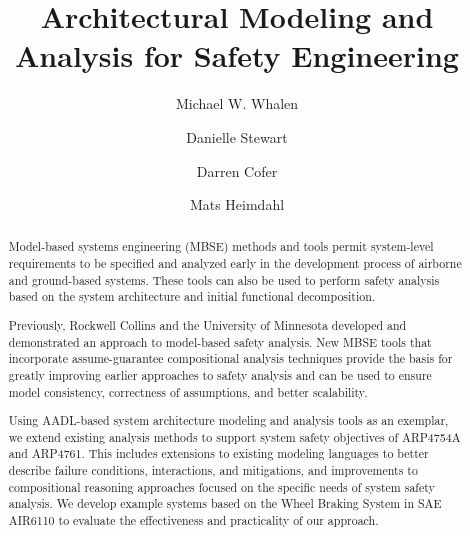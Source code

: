 \documentclass{llncs}
\begin{document}
\newcommand{\stateequiv}{\equiv_{s}}
\newcommand{\traceequiv}{\equiv_{\sigma}}
\newcommand{\ta}{\text{TA}}
\newcommand{\cta}{\text{TA$_{C}$}}
\newcommand{\tta}{\text{TA$_{T}$}}
\newcommand{\ucalg}{\texttt{\small{IVC\_UC}}}
\newcommand{\ucbfalg}{\texttt{\small{IVC\_UCBF}}}


\title{Architectural Modeling and Analysis for Safety Engineering}
%
\author{Michael W. Whalen
\and Danielle Stewart
\and Darren Cofer
\and Mats Heimdahl}

\maketitle

\begin{abstract}
Model-based systems engineering (MBSE) methods and tools permit system-level requirements to be specified and analyzed early in the development process of airborne and ground-based systems. These tools can also be used to perform safety analysis based on the system architecture and initial functional decomposition.

Previously, Rockwell Collins and the University of Minnesota developed and demonstrated an approach to model-based safety analysis. New MBSE tools that incorporate assume-guarantee compositional analysis techniques provide the basis for greatly improving earlier approaches to safety analysis and can be used to ensure model consistency, correctness of assumptions, and better scalability.

Using AADL-based system architecture modeling and analysis tools as an exemplar, we extend existing analysis methods to support system safety objectives of ARP4754A and ARP4761. This includes extensions to existing modeling languages to better describe failure conditions, interactions, and mitigations, and improvements to compositional reasoning approaches focused on the specific needs of system safety analysis. We develop example systems based on the Wheel Braking System in SAE AIR6110 to evaluate the effectiveness and practicality of our approach.
\end{abstract}
\end{document}

